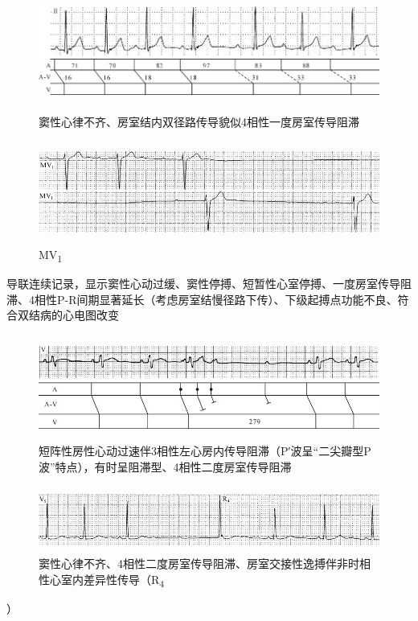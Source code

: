\begin{figure}[!htbp]
 \centering
 \includegraphics[width=5.92708in,height=1.54167in]{./images/Image00375.jpg}
 \captionsetup{justification=centering}
 \caption{窦性心律不齐、房室结内双径路传导貌似4相性一度房室传导阻滞}
 \label{fig22-9}
  \end{figure} 

\begin{figure}[!htbp]
 \centering
 \includegraphics[width=5.58333in,height=1.32292in]{./images/Image00376.jpg}
 \captionsetup{justification=centering}
 \caption{MV\textsubscript{1}}
 \label{fig22-10}
  \end{figure} 
导联连续记录，显示窦性心动过缓、窦性停搏、短暂性心室停搏、一度房室传导阻滞、4相性P-R间期显著延长（考虑房室结慢径路下传）、下级起搏点功能不良、符合双结病的心电图改变

\begin{figure}[!htbp]
 \centering
 \includegraphics[width=5.61458in,height=1.36458in]{./images/Image00377.jpg}
 \captionsetup{justification=centering}
 \caption{短阵性房性心动过速伴3相性左心房内传导阻滞（P′波呈“二尖瓣型P波”特点），有时呈阻滞型、4相性二度房室传导阻滞}
 \label{fig22-11}
  \end{figure} 

\begin{figure}[!htbp]
 \centering
 \includegraphics[width=5.58333in,height=0.85417in]{./images/Image00378.jpg}
 \captionsetup{justification=centering}
 \caption{窦性心律不齐、4相性二度房室传导阻滞、房室交接性逸搏伴非时相性心室内差异性传导（R\textsubscript{4}}
 \label{fig22-12}
  \end{figure} 
）

